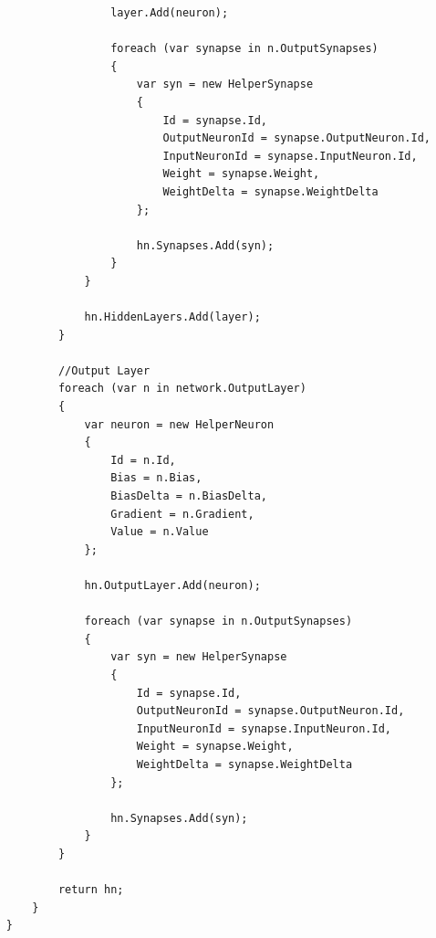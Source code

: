 \documentclass[12pt,a4paper]{article}
\begin{document}
\begin{lstlisting}
					layer.Add(neuron);

					foreach (var synapse in n.OutputSynapses)
					{
						var syn = new HelperSynapse
						{
							Id = synapse.Id,
							OutputNeuronId = synapse.OutputNeuron.Id,
							InputNeuronId = synapse.InputNeuron.Id,
							Weight = synapse.Weight,
							WeightDelta = synapse.WeightDelta
						};

						hn.Synapses.Add(syn);
					}
				}

				hn.HiddenLayers.Add(layer);
			}

			//Output Layer
			foreach (var n in network.OutputLayer)
			{
				var neuron = new HelperNeuron
				{
					Id = n.Id,
					Bias = n.Bias,
					BiasDelta = n.BiasDelta,
					Gradient = n.Gradient,
					Value = n.Value
				};

				hn.OutputLayer.Add(neuron);

				foreach (var synapse in n.OutputSynapses)
				{
					var syn = new HelperSynapse
					{
						Id = synapse.Id,
						OutputNeuronId = synapse.OutputNeuron.Id,
						InputNeuronId = synapse.InputNeuron.Id,
						Weight = synapse.Weight,
						WeightDelta = synapse.WeightDelta
					};

					hn.Synapses.Add(syn);
				}
			}

			return hn;
		}
	}
	\end{lstlisting}
	
\end{document}
